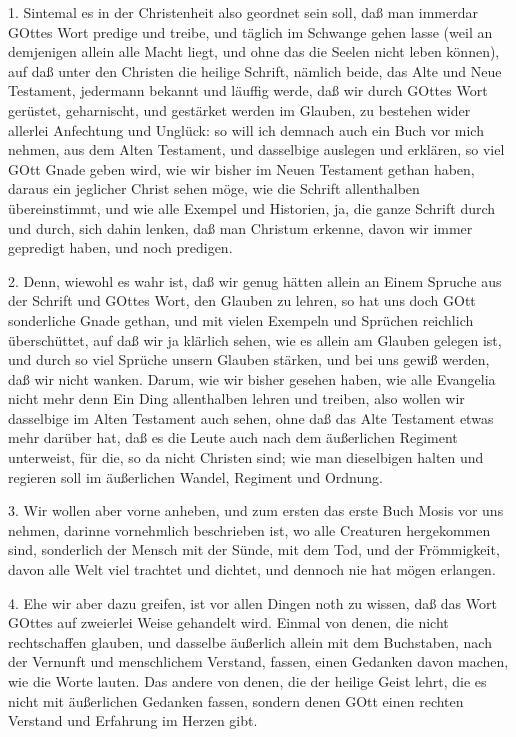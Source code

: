1. Sintemal es in der Christenheit also geordnet sein soll, daß man immerdar GOttes Wort predige und treibe, und täglich im Schwange gehen lasse (weil an demjenigen allein alle Macht liegt, und ohne das die Seelen nicht leben können), auf daß unter den Christen die heilige Schrift, nämlich beide, das Alte und Neue Testament, jedermann bekannt und läuffig werde, daß wir durch GOttes Wort gerüstet, geharnischt, und gestärket werden im Glauben, zu bestehen wider allerlei Anfechtung und Unglück: so will ich demnach auch ein Buch vor mich nehmen, aus dem Alten Testament, und dasselbige auslegen und erklären, so viel GOtt Gnade geben wird, wie wir bisher im Neuen Testament gethan haben, daraus ein jeglicher Christ sehen möge, wie die Schrift allenthalben übereinstimmt, und wie alle Exempel und Historien, ja, die ganze Schrift durch und durch, sich dahin lenken, daß man Christum erkenne, davon wir immer gepredigt haben, und noch predigen.

2. Denn, wiewohl es wahr ist, daß wir genug hätten allein an Einem Spruche aus der Schrift und GOttes Wort, den Glauben zu lehren, so hat uns doch GOtt sonderliche Gnade gethan, und mit vielen Exempeln und Sprüchen reichlich überschüttet, auf daß wir ja klärlich sehen, wie es allein am Glauben gelegen ist, und durch so viel Sprüche unsern Glauben stärken, und bei uns gewiß werden, daß wir nicht wanken. Darum, wie wir bisher gesehen haben, wie alle Evangelia nicht mehr denn Ein Ding allenthalben lehren und treiben, also wollen wir dasselbige im Alten Testament auch sehen, ohne daß das Alte Testament etwas mehr darüber hat, daß es die Leute auch nach dem äußerlichen Regiment unterweist, für die, so da nicht Christen sind; wie man dieselbigen halten und regieren soll im äußerlichen Wandel, Regiment und Ordnung.

3. Wir wollen aber vorne anheben, und zum ersten das erste Buch Mosis vor uns nehmen, darinne vornehmlich beschrieben ist, wo alle Creaturen hergekommen sind, sonderlich der Mensch mit der Sünde, mit dem Tod, und der Frömmigkeit, davon alle Welt viel trachtet und dichtet, und dennoch nie hat mögen erlangen.

4. Ehe wir aber dazu greifen, ist vor allen Dingen noth zu wissen, daß das Wort GOttes auf zweierlei Weise gehandelt wird. Einmal von denen, die nicht rechtschaffen glauben, und dasselbe äußerlich allein mit dem Buchstaben, nach der Vernunft und menschlichem Verstand, fassen, einen Gedanken davon machen, wie die Worte lauten. Das andere von denen, die der heilige Geist lehrt, die es nicht mit äußerlichen Gedanken fassen, sondern denen GOtt einen rechten Verstand und Erfahrung im Herzen gibt.

